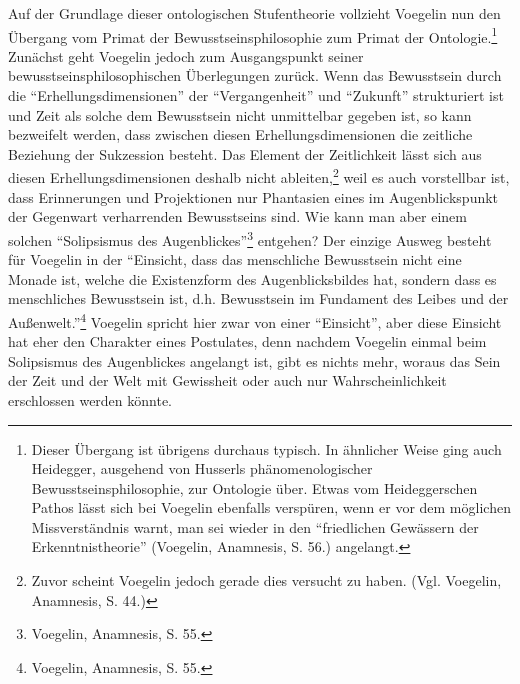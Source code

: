 Auf der Grundlage dieser ontologischen Stufentheorie vollzieht Voegelin nun
den Übergang vom Primat der Bewusstseinsphilosophie zum Primat der
Ontologie.\footnote{Dieser Übergang ist übrigens durchaus typisch. In
  ähnlicher Weise ging auch Heidegger, ausgehend von Husserls
  phänomenologischer Bewusstseinsphilosophie, zur Ontologie über. Etwas vom
  Heideggerschen Pathos lässt sich bei Voegelin ebenfalls verspüren, wenn er
  vor dem möglichen Missverständnis warnt, man sei wieder in den "`friedlichen
  Gewässern der Erkenntnistheorie"' (Voegelin, Anamnesis, S. 56.) angelangt.}
Zunächst geht Voegelin jedoch zum Ausgangspunkt seiner
bewusstseinsphilosophischen Überlegungen zurück. Wenn das Bewusstsein durch die
"`Erhellungsdimensionen"' der "`Vergangenheit"' und "`Zukunft"' strukturiert
ist und Zeit als solche dem Bewusstsein nicht unmittelbar gegeben ist, so kann
bezweifelt werden, dass zwischen diesen Erhellungsdimensionen die zeitliche
Beziehung der Sukzession besteht. Das Element der Zeitlichkeit lässt sich aus
diesen Erhellungsdimensionen deshalb nicht ableiten,\footnote{Zuvor scheint
  Voegelin jedoch gerade dies versucht zu haben. (Vgl. Voegelin, Anamnesis,
  S. 44.)} weil es auch vorstellbar ist, dass Erinnerungen und Projektionen nur
Phantasien eines im Augenblickspunkt der Gegenwart verharrenden Bewusstseins
sind. Wie kann man aber einem solchen "`Solipsismus des
Augenblickes"'\footnote{Voegelin, Anamnesis, S. 55.} entgehen? Der einzige
Ausweg besteht für Voegelin in der "`Einsicht, dass das menschliche Bewusstsein
nicht eine Monade ist, welche die Existenzform des Augenblicksbildes hat,
sondern dass es menschliches Bewusstsein ist, d.h. Bewusstsein im Fundament des
Leibes und der Außenwelt."'\footnote{Voegelin, Anamnesis, S. 55.} Voegelin
spricht hier zwar von einer "`Einsicht"', aber diese Einsicht hat eher den
Charakter eines Postulates, denn nachdem Voegelin einmal beim Solipsismus des
Augenblickes angelangt ist, gibt es nichts mehr, woraus das Sein der Zeit und
der Welt mit Gewissheit oder auch nur Wahrscheinlichkeit erschlossen werden
könnte.

